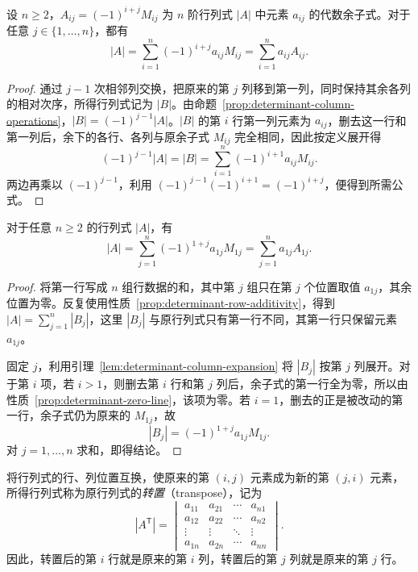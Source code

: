 \begin{lemma}[按任意一列展开]
\label{lem:determinant-column-expansion}
设 $n\geq 2$，$A_{ij}=(-1)^{i+j}M_{ij}$ 为 $n$ 阶行列式 $|A|$ 中元素 $a_{ij}$ 的代数余子式。对于任意 $j\in\{1,\ldots,n\}$，都有
\begin{equation}
\label{eq:determinant-arbitrary-column-expansion}
    |A|=\sum_{i=1}^{n}(-1)^{i+j}a_{ij}M_{ij}
        =\sum_{i=1}^{n}a_{ij}A_{ij}.
\end{equation}
\end{lemma}

\begin{proof}
通过 $j-1$ 次相邻列交换，把原来的第 $j$ 列移到第一列，同时保持其余各列的相对次序，所得行列式记为 $|B|$。由命题~\ref{prop:determinant-column-operations}，$|B|=(-1)^{j-1}|A|$。$|B|$ 的第 $i$ 行第一列元素为 $a_{ij}$，删去这一行和第一列后，余下的各行、各列与原余子式 $M_{ij}$ 完全相同，因此按定义展开得
\[
    (-1)^{j-1}|A|=|B|=\sum_{i=1}^{n}(-1)^{i+1}a_{ij}M_{ij}.
\]
两边再乘以 $(-1)^{j-1}$，利用 $(-1)^{j-1}(-1)^{i+1}=(-1)^{i+j}$，便得到所需公式。
\end{proof}

\begin{lemma}[按第一行展开]
\label{lem:determinant-first-row-expansion}
对于任意 $n\geq 2$ 的行列式 $|A|$，有
\begin{equation}
\label{eq:determinant-first-row-expansion}
    |A|=\sum_{j=1}^{n}(-1)^{1+j}a_{1j}M_{1j}
        =\sum_{j=1}^{n}a_{1j}A_{1j}.
\end{equation}
\end{lemma}

\begin{proof}
将第一行写成 $n$ 组行数据的和，其中第 $j$ 组只在第 $j$ 个位置取值 $a_{1j}$，其余位置为零。反复使用性质~\ref{prop:determinant-row-additivity}，得到 $|A|=\sum_{j=1}^{n}|B_j|$，这里 $|B_j|$ 与原行列式只有第一行不同，其第一行只保留元素 $a_{1j}$。

固定 $j$，利用引理~\ref{lem:determinant-column-expansion} 将 $|B_j|$ 按第 $j$ 列展开。对于第 $i$ 项，若 $i>1$，则删去第 $i$ 行和第 $j$ 列后，余子式的第一行全为零，所以由性质~\ref{prop:determinant-zero-line}，该项为零。若 $i=1$，删去的正是被改动的第一行，余子式仍为原来的 $M_{1j}$，故
\[
    |B_j|=(-1)^{1+j}a_{1j}M_{1j}.
\]
对 $j=1,\ldots,n$ 求和，即得结论。
\end{proof}

\begin{definition}
\label{def:determinant-transpose}
将行列式的行、列位置互换，使原来的第 $(i,j)$ 元素成为新的第 $(j,i)$ 元素，所得行列式称为原行列式的\emph{转置}（transpose），记为
\[
    |A^{\mathsf T}|=
    \begin{vmatrix}
        a_{11} & a_{21} & \cdots & a_{n1} \\
        a_{12} & a_{22} & \cdots & a_{n2} \\
        \vdots & \vdots & \ddots & \vdots \\
        a_{1n} & a_{2n} & \cdots & a_{nn}
    \end{vmatrix}.
\]
因此，转置后的第 $i$ 行就是原来的第 $i$ 列，转置后的第 $j$ 列就是原来的第 $j$ 行。
\end{definition}

